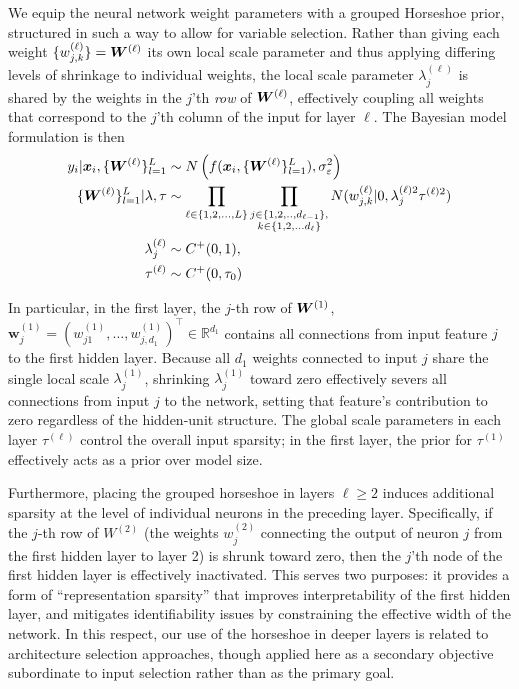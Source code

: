 We equip the neural network weight parameters with a grouped Horseshoe prior, 
structured in such a way to allow for variable selection. 
Rather than giving each weight $\{w^{(\ell)}_{j,k}\} = \bm{W}^{(\ell)}$ its own local scale parameter and thus applying differing levels of shrinkage to individual weights, 
the local scale parameter $\lambda^{(\ell)}_j$ is shared by the weights in the $j$'th \textit{row} of $\bm{W}^{(\ell)}$, effectively coupling all weights that correspond to the $j$'th column of the input for layer $\ell$. 
The Bayesian model formulation is then
\begin{equation}
    \begin{aligned}
          y_i | \bm{x}_i, \{\bm{W}^{(\ell)}\}^L_{l=1}
            & \sim N\left( f(\bm{x}_i, \{\bm{W}^{(\ell)}\}^L_{l=1} ), \sigma_\varepsilon^2 \right)
          \\
          \{\bm{W}^{(\ell)}\}^L_{l=1}  | \lambda, \tau
            & \sim 
            \prod_{\ell \in \{1, 2, ..., L\}}
            \prod_{
            \substack{
              j \in \{1, 2, .., d_{\ell-1}\}, \\ 
              k \in \{1, 2, ... d_\ell\}}
            } 
            N(w^{(\ell)}_{j,k} | 0, \lambda^{(\ell)2}_{j} \tau^{(\ell)2})
          \\
          \lambda^{(\ell)}_j 
            & \sim C^+ (0, 1), \qquad
          \\
          \tau^{(\ell)} 
            & \sim C^+ (0, \tau_0)
    \end{aligned}
\end{equation}

In particular, in the first layer,
the $j$-th row of $\bm{W}^{(1)}$,
$\mathbf{w}_j^{(1)} = (w_{j1}^{(1)}, \ldots,
w_{j, d_1}^{(1)})^\top \in \mathbb{R}^{d_1}$ contains all
connections from input feature $j$ to the first hidden layer.
Because all $d_1$ weights connected to input $j$ share the single local
scale $\lambda^{(1)}_j$, shrinking $\lambda^{(1)}_j$ toward zero effectively
severs all connections from input $j$ to the network, setting
that feature's contribution to zero regardless of the hidden-unit
structure.  The global scale parameters in each layer $\tau^{(\ell)}$ control the overall
input sparsity; in the first layer, the prior for $\tau^{(1)}$ effectively acts as a prior over model size. 


Furthermore, placing the grouped horseshoe in layers $\ell \geq 2$ induces additional sparsity at
the level of individual neurons in the preceding layer.  Specifically, if the
$j$-th row of $W^{(2)}$ (the weights $w_j^{(2)}$ connecting the output of neuron $j$ from the first
hidden layer to layer 2) is shrunk toward zero, then the $j$'th node of
the first hidden layer is effectively inactivated.  
This serves two purposes: it provides a form of
``representation sparsity'' that improves interpretability of the
first hidden layer, and mitigates identifiability issues
by constraining the effective width of the network.  In this respect, our use of
the horseshoe in deeper layers is related to architecture
selection approaches, though applied here as a secondary
objective subordinate to input selection rather than as the
primary goal.  


